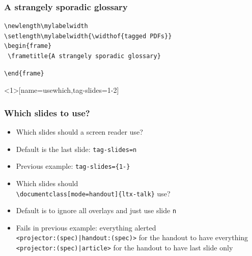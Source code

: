 \documentclass{ltx-talk}
\begin{document}
\newlength\mylabelwidth
\setlength{}
\begin{frame*}
  \frametitle{A strangely sporadic glossary}
 \begin{minipage}{.54\textwidth}
 \lstset{aboveskip=0pt,belowskip=0pt}
 \begin{lstlisting}
\newlength\mylabelwidth
\setlength\mylabelwidth{\widthof{tagged PDFs}}
\begin{frame}
 \frametitle{A strangely sporadic glossary}
\end{lstlisting}
%
\begin{lstlisting}
\end{frame}
\end{lstlisting}
 \end{minipage}%
 \begin{minipage}{.46\textwidth}

\end{minipage}
\end{frame*}

\begin{frame*}<1>[name=usewhich,tag-slides={1-2}]
\frametitle{Which slides to use?}
\begin{itemize}
\item Which slides should a screen reader use?
\item Default is the last slide: \texttt{tag-slides=n}
\item<2> Previous example: \texttt{tag-slides=\{1-\}}\bigskip
\item Which slides should\\
\verb|\documentclass[mode=handout]{ltx-talk}| use?
\item Default is to ignore all overlays and just use slide \texttt{n}
\item<2> Fails in previous example: everything alerted\\
\verb#<projector:(spec)|handout:(spec)># for the handout to have everything\\
\verb#<projector:(spec)|article># for the handout to have last slide only
\end{itemize}
\end{frame*}
\end{document}

